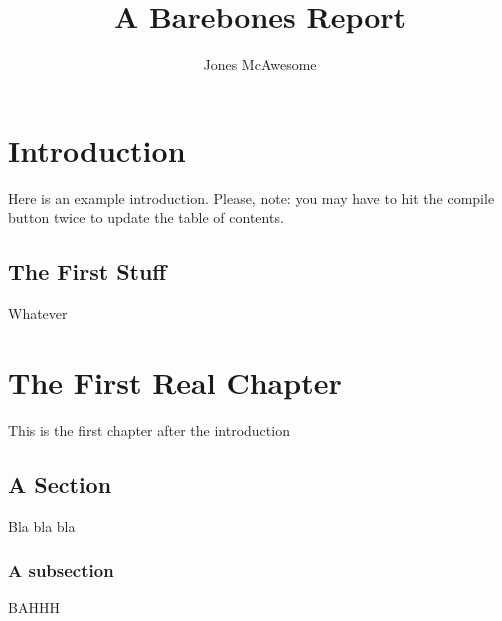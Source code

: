 \documentclass{report}
\title{A Barebones Report}
\author{Jones McAwesome}
\begin{document}
\maketitle

\tableofcontents

\chapter{Introduction}
Here is an example introduction. Please, note: you may have to hit the compile button twice to update the table of contents. 

\section{The First Stuff}
Whatever

\chapter{The First Real Chapter}
This is the first chapter after the introduction

\section{A Section}
Bla bla bla

\subsection{A subsection}
BAHHH
\end{document}
